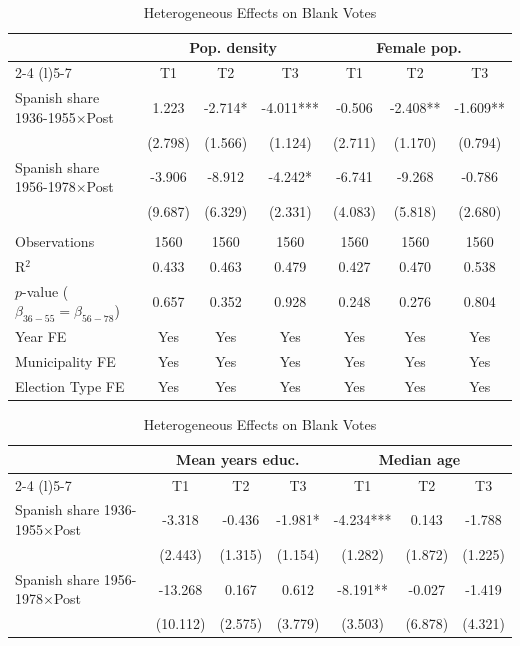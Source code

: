 \begin{table}[!h]
\centering
\renewcommand{\arraystretch}{1.15}
\setlength{\tabcolsep}{6pt}
\captionsetup{justification=centering}
\caption{Heterogeneous Effects on Blank Votes}
\begin{tabular*}{\textwidth}{l@{\extracolsep{\fill}}cccccc}
\hline
 & \multicolumn{3}{c}{Pop. density} & \multicolumn{3}{c}{Female pop.} \\
\cmidrule(l){2-4} \cmidrule(l){5-7}
  & T1 & T2 & T3 & T1  & T2  & T3 \\
\hline
Spanish share 1936-1955$\times$Post & 1.223 & -2.714* & -4.011*** & -0.506 & -2.408** & -1.609**\\
 & (2.798) & (1.566) & (1.124) & (2.711) & (1.170) & (0.794)\\
Spanish share 1956-1978$\times$Post & -3.906 & -8.912 & -4.242* & -6.741 & -9.268 & -0.786\\
 & (9.687) & (6.329) & (2.331) & (4.083) & (5.818) & (2.680)\\

 & & & & & & \\
Observations & 1560 & 1560 & 1560 & 1560 & 1560 & 1560\\
R$^2$ & 0.433 & 0.463 & 0.479 & 0.427 & 0.470 & 0.538\\
$p$-value ($\beta_{36{-}55} = \beta_{56{-}78}$) & 0.657 & 0.352 & 0.928 & 0.248 & 0.276 & 0.804\\
Year FE & Yes & Yes & Yes & Yes & Yes & Yes\\
Municipality FE & Yes & Yes & Yes & Yes & Yes & Yes\\
Election Type FE & Yes & Yes & Yes & Yes & Yes & Yes\\
\hline
\end{tabular*}
\begin{tabular*}{\textwidth}{l@{\extracolsep{\fill}}cccccc}
 & \multicolumn{3}{c}{Mean years educ.} & \multicolumn{3}{c}{Median age} \\
\cmidrule(l){2-4} \cmidrule(l){5-7}
  & T1 & T2 & T3 & T1  & T2  & T3 \\
\hline
Spanish share 1936-1955$\times$Post & -3.318 & -0.436 & -1.981* & -4.234*** & 0.143 & -1.788\\
 & (2.443) & (1.315) & (1.154) & (1.282) & (1.872) & (1.225)\\
Spanish share 1956-1978$\times$Post & -13.268 & 0.167 & 0.612 & -8.191** & -0.027 & -1.419\\
 & (10.112) & (2.575) & (3.779) & (3.503) & (6.878) & (4.321)\\


\end{tabular*}
\end{table}
